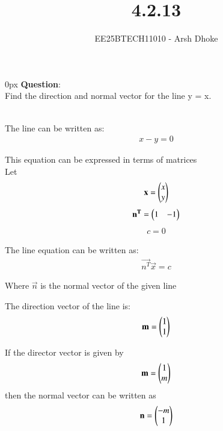 \documentclass[journal]{IEEEtran}
\begin{document}

\vspace{3cm}

\title{4.2.13}
\author{EE25BTECH11010 - Arsh Dhoke}
{\let\newpage\relax\maketitle}

\renewcommand{\thefigure}{\theenumi}
\renewcommand{\thetable}{\theenumi}
\setlength{\intextsep}{10pt}
\renewcommand{\thetable}{\theenumi}

\parindent 0px
\textbf{Question}:\\
Find the direction and normal vector for the line 
y = x.

\solution \\

The line can be written as: 
\begin{align}
x - y = 0
\end{align}

This equation can be expressed in terms of matrices\\
Let
\begin{align}
\mathbf{x} = \begin{pmatrix}x \\ y\end{pmatrix}
\end{align}
\begin{align}
\mathbf{n^T} = \begin{pmatrix}1 & -1\end{pmatrix}
\end{align}
\begin{align}
c = 0
\end{align}

The line equation can be written as:
\begin{align}
\vec{n^T}  \vec{x} = c
\end{align}

Where $\vec{n}$ is the normal vector of the given line

The direction vector of the line is:
\begin{align}
    \mathbf{m} = \begin{pmatrix}1 \\ 1\end{pmatrix}
\end{align}

If the director vector is given by
\begin{align}
\mathbf{m}  = \begin{pmatrix}1 \\ m\end{pmatrix}    
\end{align}
then the normal vector can be written as
\begin{align}
\mathbf{n} = \begin{pmatrix}-m \\ 1\end{pmatrix}
\end{align}
\end{document}
